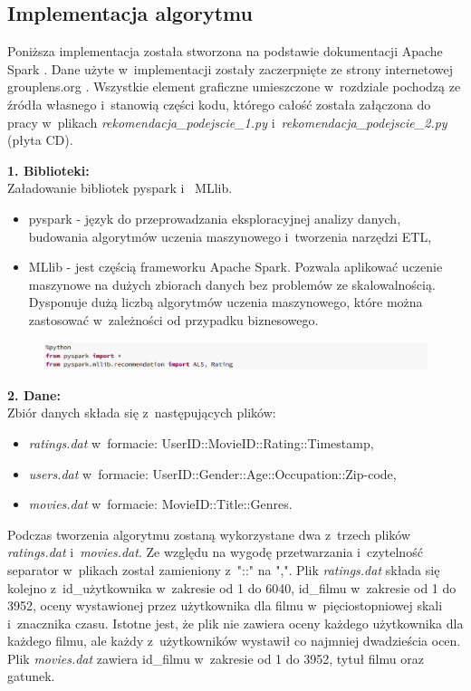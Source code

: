 \documentclass[12pt,a4paper]{report}
\begin{document}
\subsection{Implementacja algorytmu}
Poniższa implementacja została stworzona na podstawie dokumentacji Apache Spark {\citep{apache}}. Dane użyte w~implementacji zostały zaczerpnięte ze strony internetowej grouplens.org {\citep{dane}}. Wszystkie element graficzne umieszczone w~rozdziale pochodzą ze źródła własnego i~stanowią części kodu, którego całość została załączona do pracy w~plikach \textit{rekomendacja\_podejscie\_1.py} i~\textit{rekomendacja\_podejscie\_2.py} (płyta CD).

\bigskip
\textbf{1. Biblioteki:}
\\Załadowanie bibliotek pyspark i~ MLlib.
\begin{itemize}
\item pyspark - język do przeprowadzania eksploracyjnej analizy danych, budowania algorytmów uczenia maszynowego i~tworzenia narzędzi ETL,
\item MLlib - jest częścią frameworku Apache Spark. Pozwala aplikować uczenie maszynowe na dużych zbiorach danych bez problemów ze skalowalnością. Dysponuje dużą liczbą algorytmów uczenia maszynowego, które można zastosować w~zależności od przypadku biznesowego.
\end{itemize}

\begin{figure}[H]
\includegraphics[scale=0.5]{obrazy/ALS1.PNG} 
\end{figure}

\textbf{2. Dane:}
\\Zbiór danych składa się z~następujących plików: 
\begin{itemize}
\item \textit{ratings.dat} w~formacie: UserID::MovieID::Rating::Timestamp,
\item \textit{users.dat} w~formacie: UserID::Gender::Age::Occupation::Zip-code,
\item \textit{movies.dat} w~formacie: MovieID::Title::Genres.
\end{itemize}
Podczas tworzenia algorytmu zostaną wykorzystane dwa z~trzech plików \textit{ratings.dat} i~\textit{movies.dat}. 
Ze względu na wygodę przetwarzania i~czytelność separator w~plikach został zamieniony z~"::" na ",".
Plik \textit{ratings.dat} składa się kolejno z~id\_użytkownika w~zakresie od 1 do 6040, id\_filmu w~zakresie od 1 do 3952, oceny wystawionej przez użytkownika dla filmu w~pięciostopniowej skali i~znacznika czasu. Istotne jest, że plik nie zawiera oceny każdego użytkownika dla każdego filmu, ale każdy z~użytkowników wystawił co najmniej dwadzieścia ocen.
Plik \textit{movies.dat} zawiera id\_filmu w~zakresie od 1 do 3952, tytuł filmu oraz gatunek.
\bigskip
\end{document}
